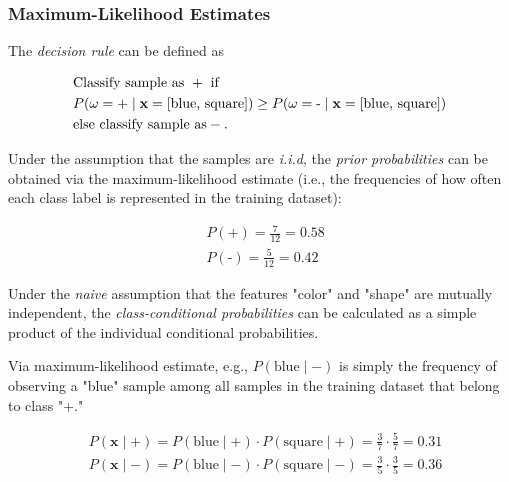 \documentclass{article}
\begin{document}
\subsubsection{Maximum-Likelihood Estimates}
 

The \emph{decision rule} can be defined as

\begin{equation} 
\begin{split}
& \text{Classify sample as } +  \text{ if}   \\
& P(\omega=\text{+} \mid \textbf x = \text{[blue, square]}) \geq P(\omega=\text{-} \mid \textbf x = \text{[blue, square]})\\
& \text{else classify sample as} -. 
\end{split}
\end{equation} 



Under the assumption that the samples are \emph{i.i.d}, the  \emph{prior probabilities} can be obtained via the maximum-likelihood estimate (i.e., the frequencies of how often each class label is represented in the training dataset):

\begin{equation} 
\begin{split}
& P(\text{+}) = \frac{7}{12} = 0.58 \\
& P(\text{-}) = \frac{5}{12} = 0.42
\end{split}
\end{equation} 


Under the \emph{naive} assumption that the features "color" and "shape" are mutually independent, the \emph{class-conditional probabilities} can be calculated as a simple product of the individual conditional probabilities.

Via maximum-likelihood estimate, e.g., $P(\text{blue} \mid -)$ is simply the frequency of observing a "blue" sample among all samples in the training dataset that belong to class "+."

\begin{equation} 
\begin{split}
& P(\textbf{x} \mid +) = P(\text{blue} \mid +) \cdot P(\text{square} \mid +) = \frac{3}{7} \cdot \frac{5}{7} = 0.31  \\
& P(\textbf{x} \mid -) = P(\text{blue} \mid -) \cdot P(\text{square} \mid -) = \frac{3}{5} \cdot \frac{3}{5} = 0.36 
\end{split}
\end{equation} 
\end{document}
